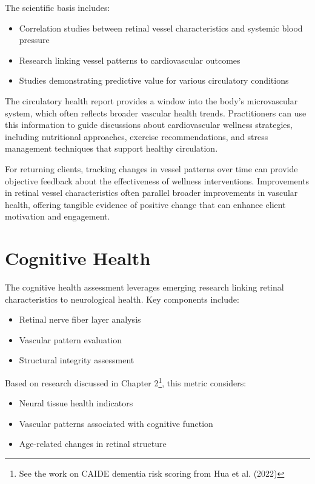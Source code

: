 \documentclass[
  Letterpaper,
]{scrbook}
\providecommand{\tightlist}{%
  \setlength{\itemsep}{0pt}\setlength{\parskip}{0pt}}\usepackage{longtable,booktabs,array}
\begin{document}
The scientific basis includes:

\begin{itemize}
\tightlist
\item
  Correlation studies between retinal vessel characteristics and
  systemic blood pressure
\item
  Research linking vessel patterns to cardiovascular outcomes
\item
  Studies demonstrating predictive value for various circulatory
  conditions
\end{itemize}

The circulatory health report provides a window into the body's
microvascular system, which often reflects broader vascular health
trends. Practitioners can use this information to guide discussions
about cardiovascular wellness strategies, including nutritional
approaches, exercise recommendations, and stress management techniques
that support healthy circulation.

For returning clients, tracking changes in vessel patterns over time can
provide objective feedback about the effectiveness of wellness
interventions. Improvements in retinal vessel characteristics often
parallel broader improvements in vascular health, offering tangible
evidence of positive change that can enhance client motivation and
engagement.

\section{Cognitive Health}\label{cognitive-health}

The cognitive health assessment leverages emerging research linking
retinal characteristics to neurological health. Key components include:

\begin{itemize}
\tightlist
\item
  Retinal nerve fiber layer analysis
\item
  Vascular pattern evaluation
\item
  Structural integrity assessment
\end{itemize}

Based on research discussed in Chapter 2\footnote{See the work on CAIDE
  dementia risk scoring from Hua et al. (2022)}, this metric considers:

\begin{itemize}
\tightlist
\item
  Neural tissue health indicators
\item
  Vascular patterns associated with cognitive function
\item
  Age-related changes in retinal structure
\end{itemize}
\end{document}
